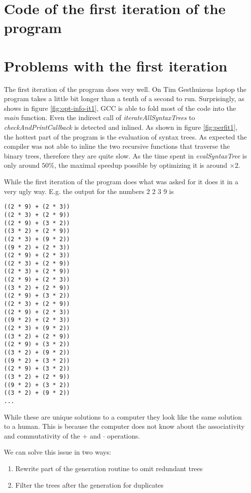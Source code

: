 \documentclass[11pt,a4paper]{article}
\begin{document}
\section{Code of the first iteration of the program}



\section{Problems with the first iteration}

The first iteration of the program does very well. On Tim Gesthuizens
laptop the program takes a little bit longer than a tenth of a second
to run.
Surprisingly, as shows in figure \ref{fig:opt-info-it1}, GCC is able to
fold most of the code into the \textit{main} function.
Even the indirect call of \textit{iterateAllSyntaxTrees} to
\textit{checkAndPrintCallback} is detected and inlined.
As shown in figure \ref{fig:perfit1}, the hottest part of the program
is the evaluation of syntax trees.
As expected the compiler was not able to inline the two recursive
functions that traverse the binary trees, therefore they are quite
slow.
As the time spent in \textit{evalSyntaxTree} is only around $50\%$,
the maximal speedup possible by optimizing it is around $\times 2$.

While the first iteration of the program does what was asked for it
does it in a very ugly way. E.g. the output for the numbers $2$ $2$ $3$ $9$
is
\begin{verbatim}
((2 * 9) + (2 * 3))
((2 * 3) + (2 * 9))
((2 * 9) + (3 * 2))
((3 * 2) + (2 * 9))
((2 * 3) + (9 * 2))
((9 * 2) + (2 * 3))
((2 * 9) + (2 * 3))
((2 * 3) + (2 * 9))
((2 * 3) + (2 * 9))
((2 * 9) + (2 * 3))
((3 * 2) + (2 * 9))
((2 * 9) + (3 * 2))
((2 * 3) + (2 * 9))
((2 * 9) + (2 * 3))
((9 * 2) + (2 * 3))
((2 * 3) + (9 * 2))
((3 * 2) + (2 * 9))
((2 * 9) + (3 * 2))
((3 * 2) + (9 * 2))
((9 * 2) + (3 * 2))
((2 * 9) + (3 * 2))
((3 * 2) + (2 * 9))
((9 * 2) + (3 * 2))
((3 * 2) + (9 * 2))
...
\end{verbatim}

While these are unique solutions to a computer they look like the same
solution to a human. This is because the computer does not know about
the associativity and commutativity of the $+$ and $\cdot$
operations.

We can solve this issue in two ways:
\begin{enumerate}
\item \label{opt:rewrite} Rewrite part of the generation routine to
  omit redundant trees
\item \label{opt:filter} Filter the trees after the generation for
  duplicates
\end{enumerate}
\end{document}
